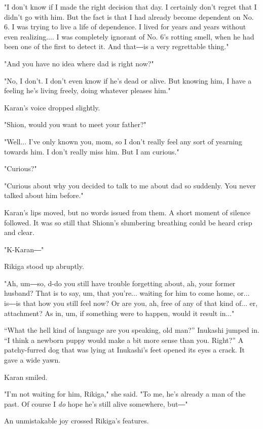 "I don't know if I made the right decision that day. I certainly don't
regret that I didn't go with him. But the fact is that I had already
become dependent on No. 6. I was trying to live a life of dependence. I
lived for years and years without even realizing.... I was completely
ignorant of No. 6's rotting smell, when he had been one of the first to
detect it. And that―is a very regrettable thing."

"And you have no idea where dad is right now?"

"No, I don't. I don't even know if he's dead or alive. But knowing him,
I have a feeling he's living freely, doing whatever pleases him."

Karan's voice dropped slightly.

"Shion, would you want to meet your father?"

"Well... I've only known you, mom, so I don't really feel any sort of
yearning towards him. I don't really miss him. But I am curious."

"Curious?"

"Curious about why you decided to talk to me about dad so suddenly. You
never talked about him before."

Karan's lips moved, but no words issued from them. A short moment of
silence followed. It was so still that Shionn's slumbering breathing
could be heard crisp and clear.

\mybreak

"K-Karan―"

Rikiga stood up abruptly.

"Ah, um―so, d-do you still have trouble forgetting about, ah, your
former husband? That is to say, um, that you're... waiting for him to
come home, or... is―is that how you still feel now? Or are you, ah, free
of any of that kind of... er, attachment? As in, um, if something were
to happen, would it result in..."

``What the hell kind of language are you speaking, old man?'' Inukashi
jumped in. ``I think a newborn puppy would make a bit more sense than
you. Right?'' A patchy-furred dog that was lying at Inukashi's feet
opened its eyes a crack. It gave a wide yawn.~

Karan smiled.

"I'm not waiting for him, Rikiga," she said. "To me, he's already a man
of the past. Of course I \emph{do} hope he's still alive somewhere, but―"

An unmistakable joy crossed Rikiga's features.


